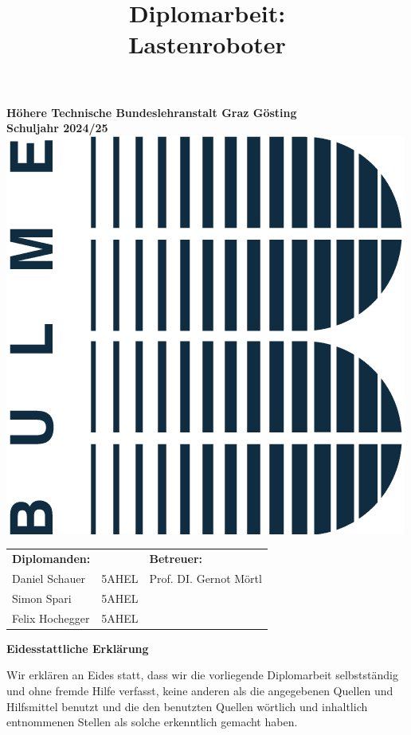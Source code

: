 \documentclass[ngerman,12pt,a4paper]{article}
\title{\textbf{\Huge Diplomarbeit: \\ Lastenroboter}}
\date{}
\begin{document}
	\maketitle
	\begin{center}
		\textbf{Höhere Technische Bundeslehranstalt Graz Gösting}\\
		\textbf{Schuljahr 2024/25}\\[0.5 cm]
		\includegraphics[scale=0.5]{Pictures/bulme_logo}\\[1 cm]
		\begin{tabular}{l l l}
			\textbf{Diplomanden:} & & \textbf{Betreuer:} \\
			Daniel Schauer & 5AHEL & Prof. DI. Gernot Mörtl \\
			Simon Spari & 5AHEL & \\
			Felix Hochegger & 5AHEL & \\
		\end{tabular}
	\end{center}
	\newpage
	\begin{flushleft}
		\textbf{\Huge Eidesstattliche Erklärung}\\[0.5 cm]
	\end{flushleft}
	Wir erklären an Eides statt, dass wir die vorliegende Diplomarbeit selbstständig und ohne fremde Hilfe verfasst, keine anderen als die angegebenen Quellen und Hilfsmittel benutzt und die den benutzten Quellen wörtlich und inhaltlich entnommenen Stellen als solche erkenntlich gemacht haben. 
	\vspace{2cm}
	
\end{document}
